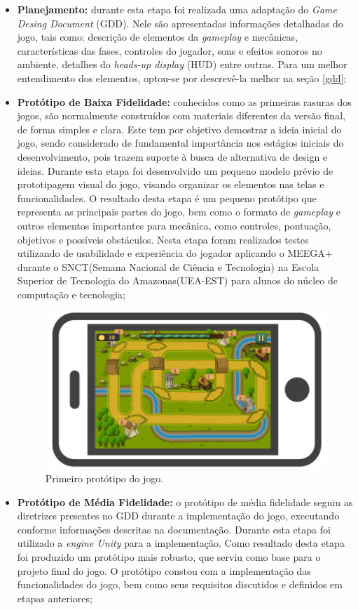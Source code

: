 \documentclass[10pt, conference, compsocconf]{IEEEtran}
\begin{document}
\begin{itemize}
	\item \textbf{Planejamento:} durante esta etapa foi realizada uma adaptação do \textit{Game Desing Document} (GDD). Nele são apresentadas informações detalhadas do jogo, tais como: descrição de elementos da \textit{gameplay} e mecânicas, características das fases, controles do jogador, sons e efeitos sonoros no ambiente, detalhes do \textit{heads-up display} (HUD) entre outras. Para um melhor entendimento dos elementos, optou-se por descrevê-la melhor na seção \ref{gdd};	

	\item \textbf{Protótipo de Baixa Fidelidade:} conhecidos como as primeiras rasuras dos jogos, são normalmente construídos com materiais diferentes da versão final, de forma simples e clara. Este tem por objetivo demostrar a ideia inicial do jogo, sendo considerado de fundamental importância nos estágios iniciais do desenvolvimento, pois trazem suporte à busca de alternativa de design e ideias. Durante esta etapa foi desenvolvido um pequeno modelo prévio de prototipagem visual do jogo, visando organizar os elementos nas telas e funcionalidades. O resultado desta etapa é um pequeno protótipo que representa as principais partes do jogo, bem como o formato de \textit{gameplay} e outros elementos importantes para mecânica, como controles, pontuação, objetivos e possíveis obstáculos. Nesta etapa foram realizados testes utilizando de usabilidade e experiência do jogador aplicando o MEEGA+ durante o SNCT(Semana Nacional de Ciência e Tecnologia) na Escola Superior de Tecnologia do Amazonas(UEA-EST) para alunos do núcleo de computação e tecnologia;
	
	\begin{figure}[!ht]
		\centering
		\includegraphics[width=0.8\linewidth]{Figuras/prototipo1.png}		
		\caption{Primeiro protótipo do jogo.}
		\label{prototipo1}
	\end{figure}

	\item \textbf{Protótipo de Média Fidelidade:} o protótipo de média fidelidade seguiu as diretrizes presentes no GDD durante a implementação do jogo, executando conforme informações descritas na documentação. Durante esta etapa foi utilizado a \textit{ engine Unity} para a implementação. Como resultado desta etapa foi produzido um protótipo mais robusto, que serviu como base para o projeto final do jogo. O protótipo constou com a implementação das funcionalidades do jogo, bem como seus requisitos discutidos e definidos em etapas anteriores;
	

\end{itemize}
\end{document}
